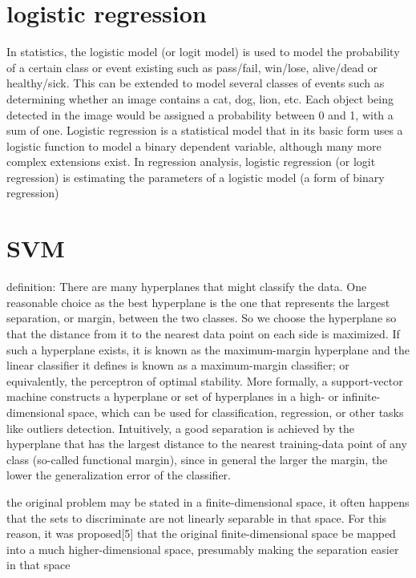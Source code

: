 \documentclass[
]{report}
\begin{document}
\hypertarget{logistic-regression}{%
\section{logistic regression}\label{logistic-regression}}

In statistics, the logistic model (or logit model) is used to model the probability of a certain class or event existing such as pass/fail, win/lose, alive/dead or healthy/sick. This can be extended to model several classes of events such as determining whether an image contains a cat, dog, lion, etc. Each object being detected in the image would be assigned a probability between 0 and 1, with a sum of one. Logistic regression is a statistical model that in its basic form uses a logistic function to model a binary dependent variable, although many more complex extensions exist. In regression analysis, logistic regression (or logit regression) is estimating the parameters of a logistic model (a form of binary regression)

\hypertarget{svm}{%
\section{SVM}\label{svm}}

definition: There are many hyperplanes that might classify the data. One reasonable choice as the best hyperplane is the one that represents the largest separation, or margin, between the two classes. So we choose the hyperplane so that the distance from it to the nearest data point on each side is maximized. If such a hyperplane exists, it is known as the maximum-margin hyperplane and the linear classifier it defines is known as a maximum-margin classifier; or equivalently, the perceptron of optimal stability.
More formally, a support-vector machine constructs a hyperplane or set of hyperplanes in a high- or infinite-dimensional space, which can be used for classification, regression, or other tasks like outliers detection. Intuitively, a good separation is achieved by the hyperplane that has the largest distance to the nearest training-data point of any class (so-called functional margin), since in general the larger the margin, the lower the generalization error of the classifier.

the original problem may be stated in a finite-dimensional space, it often happens that the sets to discriminate are not linearly separable in that space. For this reason, it was proposed{[}5{]} that the original finite-dimensional space be mapped into a much higher-dimensional space, presumably making the separation easier in that space
\end{document}
